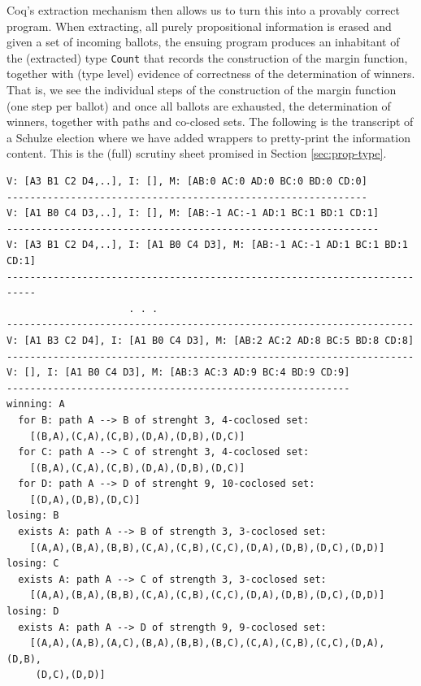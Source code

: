 Coq's extraction mechanism then allows us to turn this into a
provably correct program. When extracting, all purely propositional
information is erased and given a set of incoming ballots, the ensuing program produces an inhabitant
of the (extracted) type \texttt{Count} that records the construction
of the margin function, together with (type level) evidence of
correctness of the determination of winners. That is, we see the
individual steps of the construction of the margin function (one
step per
ballot) and once all ballots are exhausted, the determination of
winners, together with paths and co-closed sets. The following is
the transcript of a Schulze election where we have added wrappers
to pretty-print the information content. This is the (full) scrutiny
sheet promised in Section \ref{sec:prop-type}.
%
\begin{footnotesize}
\begin{verbatim}
V: [A3 B1 C2 D4,..], I: [], M: [AB:0 AC:0 AD:0 BC:0 BD:0 CD:0]
--------------------------------------------------------------
V: [A1 B0 C4 D3,..], I: [], M: [AB:-1 AC:-1 AD:1 BC:1 BD:1 CD:1]
----------------------------------------------------------------
V: [A3 B1 C2 D4,..], I: [A1 B0 C4 D3], M: [AB:-1 AC:-1 AD:1 BC:1 BD:1 CD:1]
---------------------------------------------------------------------------
                     . . .
----------------------------------------------------------------------
V: [A1 B3 C2 D4], I: [A1 B0 C4 D3], M: [AB:2 AC:2 AD:8 BC:5 BD:8 CD:8]
----------------------------------------------------------------------
V: [], I: [A1 B0 C4 D3], M: [AB:3 AC:3 AD:9 BC:4 BD:9 CD:9]
-----------------------------------------------------------
winning: A
  for B: path A --> B of strenght 3, 4-coclosed set: 
    [(B,A),(C,A),(C,B),(D,A),(D,B),(D,C)]
  for C: path A --> C of strenght 3, 4-coclosed set:
    [(B,A),(C,A),(C,B),(D,A),(D,B),(D,C)]
  for D: path A --> D of strenght 9, 10-coclosed set:
    [(D,A),(D,B),(D,C)]
losing: B
  exists A: path A --> B of strength 3, 3-coclosed set:
    [(A,A),(B,A),(B,B),(C,A),(C,B),(C,C),(D,A),(D,B),(D,C),(D,D)]
losing: C
  exists A: path A --> C of strength 3, 3-coclosed set:
    [(A,A),(B,A),(B,B),(C,A),(C,B),(C,C),(D,A),(D,B),(D,C),(D,D)]
losing: D
  exists A: path A --> D of strength 9, 9-coclosed set:
    [(A,A),(A,B),(A,C),(B,A),(B,B),(B,C),(C,A),(C,B),(C,C),(D,A),(D,B),
     (D,C),(D,D)]
\end{verbatim}
\end{footnotesize}

